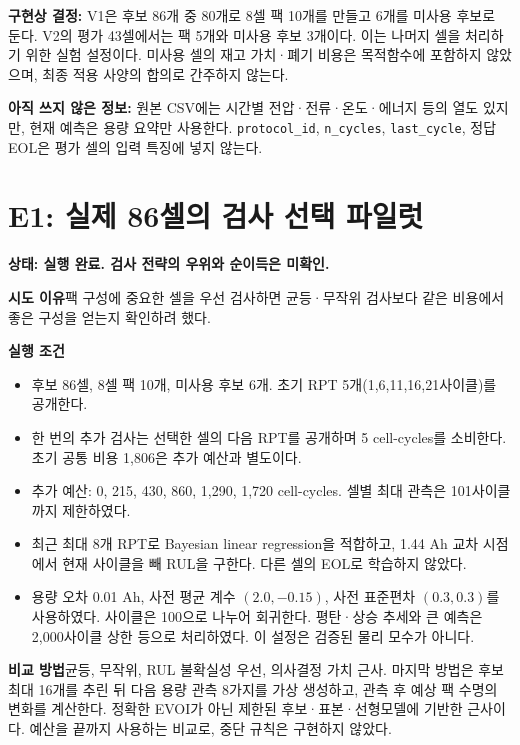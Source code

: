 \documentclass[11pt,a4paper]{article}
\newcommand{\file}[1]{{\small\nolinkurl{#1}}}
\newcommand{\state}[1]{\textbf{상태: #1}}
\begin{document}
\textbf{구현상 결정:} V1은 후보 86개 중 80개로 8셀 팩 10개를 만들고 6개를 미사용 후보로 둔다. V2의 평가 43셀에서는 팩 5개와 미사용 후보 3개이다. 이는 나머지 셀을 처리하기 위한 실험 설정이다. 미사용 셀의 재고 가치·폐기 비용은 목적함수에 포함하지 않았으며, 최종 적용 사양의 합의로 간주하지 않는다.

\textbf{아직 쓰지 않은 정보:} 원본 CSV에는 시간별 전압·전류·온도·에너지 등의 열도 있지만, 현재 예측은 용량 요약만 사용한다. \file{protocol_id}, \file{n_cycles}, \file{last_cycle}, 정답 EOL은 평가 셀의 입력 특징에 넣지 않는다.

\clearpage
\section{E1: 실제 86셀의 검사 선택 파일럿}
\state{실행 완료. 검사 전략의 우위와 순이득은 미확인.}

\textbf{시도 이유}\quad 팩 구성에 중요한 셀을 우선 검사하면 균등·무작위 검사보다 같은 비용에서 좋은 구성을 얻는지 확인하려 했다.

\textbf{실행 조건}
\begin{itemize}
\item 후보 86셀, 8셀 팩 10개, 미사용 후보 6개. 초기 RPT 5개(1,6,11,16,21사이클)를 공개한다.
\item 한 번의 추가 검사는 선택한 셀의 다음 RPT를 공개하며 5 cell-cycles를 소비한다. 초기 공통 비용 1,806은 추가 예산과 별도이다.
\item 추가 예산: 0, 215, 430, 860, 1,290, 1,720 cell-cycles. 셀별 최대 관측은 101사이클까지 제한하였다.
\item 최근 최대 8개 RPT로 Bayesian linear regression을 적합하고, 1.44 Ah 교차 시점에서 현재 사이클을 빼 RUL을 구한다. 다른 셀의 EOL로 학습하지 않았다.
\item 용량 오차 0.01 Ah, 사전 평균 계수 $(2.0,-0.15)$, 사전 표준편차 $(0.3,0.3)$를 사용하였다. 사이클은 100으로 나누어 회귀한다. 평탄·상승 추세와 큰 예측은 2,000사이클 상한 등으로 처리하였다. 이 설정은 검증된 물리 모수가 아니다.
\end{itemize}

\textbf{비교 방법}\quad 균등, 무작위, RUL 불확실성 우선, 의사결정 가치 근사. 마지막 방법은 후보 최대 16개를 추린 뒤 다음 용량 관측 8가지를 가상 생성하고, 관측 후 예상 팩 수명의 변화를 계산한다. 정확한 EVOI가 아닌 제한된 후보·표본·선형모델에 기반한 근사이다. 예산을 끝까지 사용하는 비교로, 중단 규칙은 구현하지 않았다.
\end{document}

